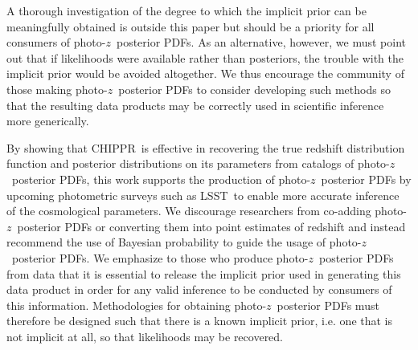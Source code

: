 \documentclass[iop]{emulateapj}
\newcommand{\todo}[3]{{\color{#2}\emph{#1}: #3}}
\newcommand{\aim}[1]{\todo{AIM}{red}{#1}}
\newcommand{\project}[1]{\textsc{#1}}
\newcommand{\lsst}{\project{LSST}}
\newcommand{\Chippr}{\project{CHIPPR}}%
\newcommand{\pz}{photo-$z$}
\newcommand{\pzpdf}{\pz\ posterior PDF}%
\newcommand{\Nz}{$N(z)$}
\begin{document}
A thorough investigation of the degree to which the implicit prior can be meaningfully obtained is outside this paper but should be a priority for all consumers of \pzpdf s.
As an alternative, however, we must point out that if likelihoods were available rather than posteriors, the trouble with the implicit prior would be avoided altogether.
We thus encourage the community of those making \pzpdf s to consider developing such methods so that the resulting data products may be correctly used in scientific inference more generically.




%

By showing that \Chippr\ is effective in recovering the true redshift distribution function and posterior distributions on its parameters from catalogs of \pzpdf s, this work supports the production of \pzpdf s by upcoming photometric surveys such as \lsst\ to enable more accurate inference of the cosmological parameters.
We discourage researchers from co-adding \pzpdf s or converting them into point estimates of redshift and instead recommend the use of Bayesian probability to guide the usage of \pzpdf s.
We emphasize to those who produce \pzpdf s from data that it is essential to release the implicit prior used in generating this data product in order for any valid inference to be conducted by consumers of this information.
Methodologies for obtaining \pzpdf s must therefore be designed such that there is a known implicit prior, i.e. one that is not implicit at all, so that likelihoods may be recovered.
\end{document}
